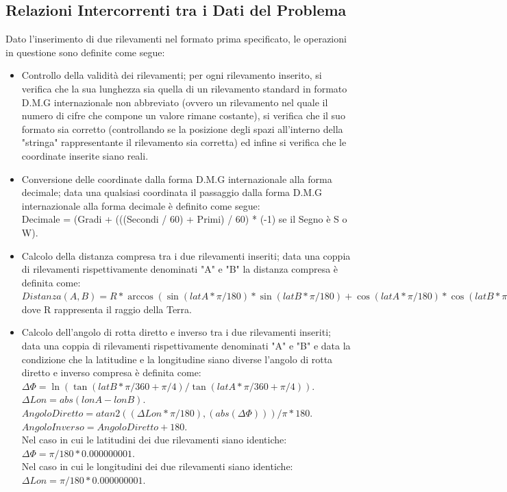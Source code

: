 \documentclass{article}
\begin{document}
\subsection{Relazioni Intercorrenti tra i Dati del Problema}
Dato l'inserimento di due rilevamenti nel formato prima specificato, le operazioni in questione sono definite come segue:
\begin{itemize}
	\item Controllo della validità dei rilevamenti; per ogni rilevamento inserito, si verifica che la sua lunghezza sia quella di un rilevamento standard in formato D.M.G internazionale non abbreviato (ovvero un rilevamento nel quale il numero di cifre che compone un valore rimane costante), si verifica che il suo formato sia corretto (controllando se la posizione degli spazi all'interno della "stringa" rappresentante il rilevamento sia corretta) ed infine si verifica che le coordinate inserite siano reali. 
	
	\item Conversione delle coordinate dalla forma D.M.G internazionale alla forma decimale; data una qualsiasi coordinata il passaggio dalla forma D.M.G internazionale alla forma decimale è definito come segue: \\
	Decimale = (Gradi + (((Secondi / 60) + Primi) / 60) * (-1) se il Segno è  S o W).
	
	\item Calcolo della distanza compresa tra i due rilevamenti inseriti;  data una coppia di rilevamenti rispettivamente denominati "A" e "B" la distanza compresa è definita come: \\
	$Distanza(A, B) = R * \arccos(\sin(latA * \pi / 180) * \sin(latB * \pi / 180) + \cos(latA * \pi / 180) * \cos(latB * \pi / 180) * \cos((lonA - lonB) * \pi / 180)). $\\
	dove R rappresenta il raggio della Terra.
	
	\item Calcolo dell'angolo di rotta diretto e inverso tra i due rilevamenti inseriti; data una coppia di rilevamenti rispettivamente denominati "A" e "B" e data la condizione che la latitudine e la longitudine siano diverse l'angolo di rotta diretto e inverso compresa è definita come: \\
	$\Delta\Phi = \ln( \tan(latB * \pi / 360 + \pi / 4 ) / \tan(latA * \pi / 360 + \pi / 4 )). $\\
	$ \Delta Lon = abs(lonA - lonB). $ \\
	$ Angolo Diretto = atan2((\Delta Lon * \pi / 180), (abs(\Delta\Phi))) / \pi * 180.$\\
	$ Angolo Inverso = Angolo Diretto + 180.$\\
	Nel caso in cui le latitudini dei due rilevamenti siano identiche:\\
	$\Delta\Phi = \pi / 180 * 0.000000001.$\\
	Nel caso in cui le longitudini dei due rilevamenti siano identiche:\\
	$\Delta Lon = \pi / 180 * 0.000000001.$\\
\end{itemize}
\newpage
\end{document}
